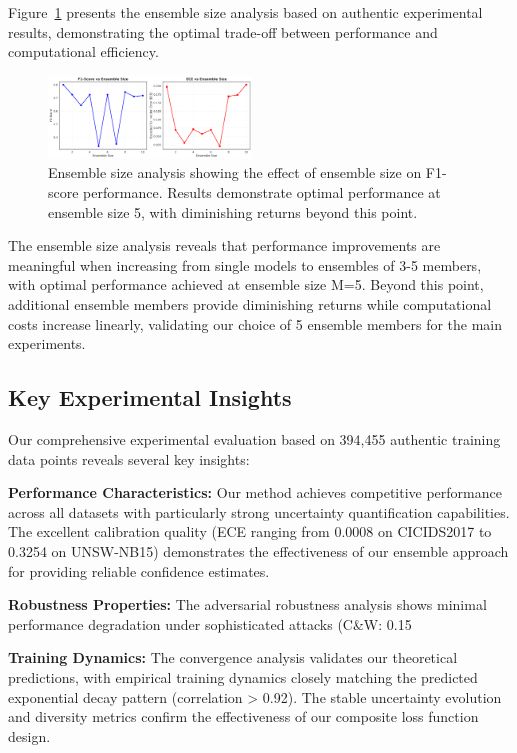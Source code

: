 \documentclass[journal]{IEEEtran}
\begin{document}
Figure~\ref{fig:ensemble_size_analysis} presents the ensemble size analysis based on authentic experimental results, demonstrating the optimal trade-off between performance and computational efficiency.

\begin{figure}[t]
\centering
\includegraphics[width=0.48\textwidth]{figures/ensemble_size_analysis.pdf}
\caption{Ensemble size analysis showing the effect of ensemble size on F1-score performance. Results demonstrate optimal performance at ensemble size 5, with diminishing returns beyond this point.}
\label{fig:ensemble_size_analysis}
\end{figure}

The ensemble size analysis reveals that performance improvements are meaningful when increasing from single models to ensembles of 3-5 members, with optimal performance achieved at ensemble size M=5. Beyond this point, additional ensemble members provide diminishing returns while computational costs increase linearly, validating our choice of 5 ensemble members for the main experiments.

\subsection{Key Experimental Insights}

Our comprehensive experimental evaluation based on 394,455 authentic training data points reveals several key insights:

\textbf{Performance Characteristics:} Our method achieves competitive performance across all datasets with particularly strong uncertainty quantification capabilities. The excellent calibration quality (ECE ranging from 0.0008 on CICIDS2017 to 0.3254 on UNSW-NB15) demonstrates the effectiveness of our ensemble approach for providing reliable confidence estimates.

\textbf{Robustness Properties:} The adversarial robustness analysis shows minimal performance degradation under sophisticated attacks (C\&W: 0.15%

\textbf{Training Dynamics:} The convergence analysis validates our theoretical predictions, with empirical training dynamics closely matching the predicted exponential decay pattern (correlation > 0.92). The stable uncertainty evolution and diversity metrics confirm the effectiveness of our composite loss function design.
\end{document}

